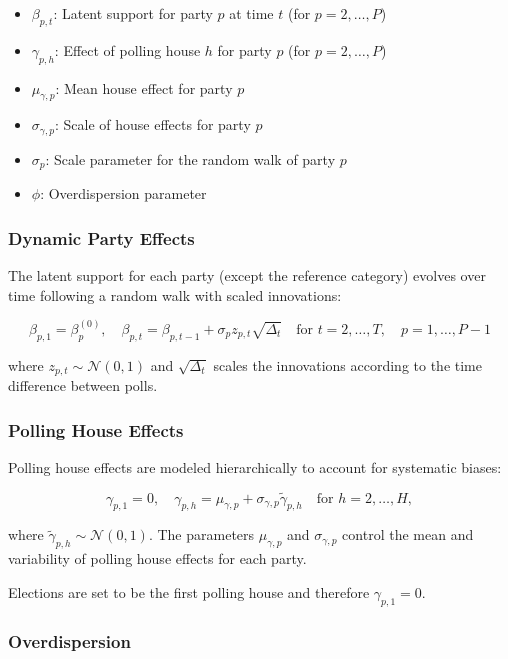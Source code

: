 \documentclass[
  letterpaper,
  DIV=11,
  numbers=noendperiod,
  oneside]{scrartcl}
\providecommand{\tightlist}{%
  \setlength{\itemsep}{0pt}\setlength{\parskip}{0pt}}\usepackage{longtable,booktabs,array}
\begin{document}
\begin{itemize}
\tightlist
\item
  \(\beta_{p,t}\): Latent support for party \(p\) at time \(t\) (for
  \(p = 2,\ldots,P\))
\item
  \(\gamma_{p,h}\): Effect of polling house \(h\) for party \(p\) (for
  \(p = 2,\ldots,P\))
\item
  \(\mu_{\gamma,p}\): Mean house effect for party \(p\)
\item
  \(\sigma_{\gamma,p}\): Scale of house effects for party \(p\)
\item
  \(\sigma_p\): Scale parameter for the random walk of party \(p\)
\item
  \(\phi\): Overdispersion parameter
\end{itemize}

\subsubsection{Dynamic Party Effects}\label{dynamic-party-effects}

The latent support for each party (except the reference category)
evolves over time following a random walk with scaled innovations:

\[
\beta_{p,1} = \beta_{p}^{(0)}, \quad \beta_{p,t} = \beta_{p,t-1} + \sigma_p z_{p,t} \sqrt{\Delta_t} \quad \text{for } t = 2, \dots, T, \quad p=1, \dots, P - 1
\]

where \(z_{p,t} \sim \mathcal{N}(0, 1)\) and \(\sqrt{\Delta_t}\) scales
the innovations according to the time difference between polls.

\subsubsection{Polling House Effects}\label{polling-house-effects}

Polling house effects are modeled hierarchically to account for
systematic biases:

\[
\gamma_{p,1} = 0, \quad \gamma_{p,h} = \mu_{\gamma,p} + \sigma_{\gamma,p} \tilde{\gamma}_{p,h} \quad \text{for } h = 2, \dots, H,
\]

where \(\tilde{\gamma}_{p,h} \sim \mathcal{N}(0, 1)\). The parameters
\(\mu_{\gamma,p}\) and \(\sigma_{\gamma,p}\) control the mean and
variability of polling house effects for each party.

Elections are set to be the first polling house and therefore
\(\gamma_{p,1} = 0\).

\subsubsection{Overdispersion}\label{overdispersion}
\end{document}

